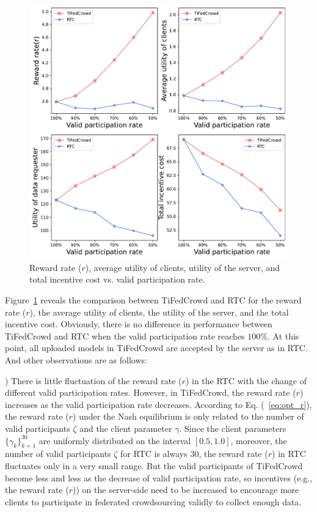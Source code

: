 \documentclass[final,1p,times]{elsarticle}
\begin{document}
\begin{figure}
	\centering
	\centerline{\includegraphics[width=5.5in]{fig3.pdf}}
	\caption{Reward rate ($r$), average utility of clients, utility of the server, and total incentive cost vs. valid participation rate.}
	\label{fig:3}
\end{figure}

Figure~\ref{fig:3} reveals the comparison between TiFedCrowd and RTC for the reward rate ($r$), the average utility of clients, the utility of the server, and the total incentive cost. Obviously, there is no difference in performance between TiFedCrowd and RTC when the valid participation rate reaches $100\%$. At this point, all uploaded models in TiFedCrowd are accepted by the server as in RTC. And other observations are as follows:

\lowercase{}) There is little fluctuation of the reward rate ($r$) in the RTC with the change of different valid participation rates. However, in TiFedCrowd, the reward rate ($r$) increases as the valid participation rate decreases. According to Eq. (~\ref{eq:opt_r}), the reward rate ($r$) under the Nash equilibrium is only related to the number of valid participants $\zeta$ and the client parameter $\gamma$. Since the client parameters $\{\gamma_k\}_{k=1}^{30}$ are uniformly distributed on the interval $[0.5, 1.0]$, moreover, the number of valid participants $\zeta$ for RTC is always $30$, the reward rate ($r$) in RTC fluctuates only in a very small range. But the valid participants of TiFedCrowd become less and less as the decrease of valid participation rate, so incentives (e.g., the reward rate ($r$)) on the server-side need to be increased to encourage more clients to participate in federated crowdsourcing validly to collect enough data. 
\end{document}
